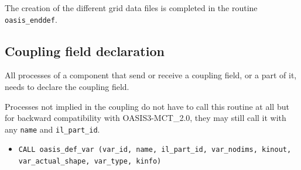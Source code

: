 The creation of the different grid data files is completed in the routine
{\tt oasis\_enddef}.

\subsection{Coupling field declaration}
\label{subsubsec_Declaration}

All processes of a component that send or receive a coupling field, or a part of it, needs to declare the coupling field.

Processes not implied in the
coupling do not have to call this routine at all but for backward
compatibility with OASIS3-MCT\_2.0, they may still call it with any {\tt name} and {\tt il\_part\_id}.

\begin{itemize}

\item {\tt CALL oasis\_def\_var (var\_id, name, il\_part\_id,
    var\_nodims, kinout, \newline var\_actual\_shape, var\_type,
    kinfo)}


\end{itemize}
